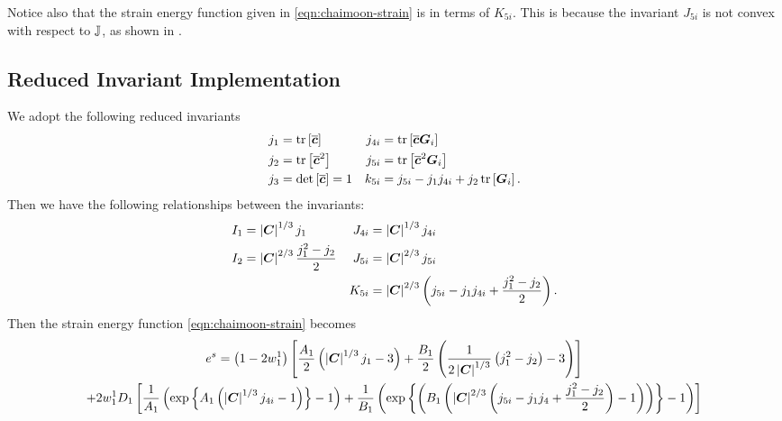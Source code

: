 \documentclass{article}
\begin{document}
\begin{remark}
   Notice also that the strain energy function given in \eqref{eqn:chaimoon-strain} is in terms of $K_{5i}$. 
   This is because the invariant $J_{5i}$ is not convex with respect to ${\mathbb J}$, as shown in \cite[Lem.~C.7]{schroder-neff-2003}.
\end{remark}

\subsection{Reduced Invariant Implementation}
We adopt the following reduced invariants
\begin{align*}
   j_1 &= \operatorname{tr}\left[\overline{{\boldsymbol c}}\right] & j_{4i} &= \operatorname{tr}\left[\overline{{\boldsymbol c}}{\boldsymbol G}_i\right] \\
   j_2 &= \operatorname{tr}\left[\overline{{\boldsymbol c}}^2\right] & j_{5i} &= \operatorname{tr}\left[\overline{{\boldsymbol c}}^2{\boldsymbol G}_i\right] \\
   j_3 &= \det\left[\overline{{\boldsymbol c}}\right] = 1 & k_{5i} &= j_{5i} - j_1j_{4i} + j_2\operatorname{tr}\left[{\boldsymbol G}_i\right].   
\end{align*}
Then we have the following relationships between the invariants:
\begin{align*}
   I_1 &= \left|{\boldsymbol C}\right|^{1/3} j_1 & J_{4i} &= \left|{\boldsymbol C}\right|^{1/3} j_{4i} \\
   I_2 &= \left|{\boldsymbol C}\right|^{2/3}\frac{j_1^2 - j_2}{2} & J_{5i} &= \left|{\boldsymbol C}\right|^{2/3} j_{5i} \\
   & & K_{5i} &= \left|{\boldsymbol C}\right|^{2/3}\left(j_{5i} - j_1j_{4i} + \frac{j_1^2 - j_2}{2}\right).
\end{align*}
Then the strain energy function \eqref{eqn:chaimoon-strain} becomes 
\begin{multline}
\label{eqn:aortic-eos}
    e^s=\left(1-2 w^1_1 \right)\left[\frac{A_1}{2}\left(\left|{\boldsymbol C}\right|^{1/3}j_1-3\right)+\frac{B_1}{2}\left(\frac{1}{2\left|{\boldsymbol C}\right|^{1/3}}\left(j_1^2-j_2\right)-3\right)\right]\\
    +2w^1_1D_1\left[\frac{1}{A_1}\left(\exp\left\{A_1\left(\left|{\boldsymbol C}\right|^{1/3}j_{4i}-1\right)\right\}-1\right)+\frac{1}{B_1}\left(\exp\left\{\left(B_1\left(\left|{\boldsymbol C}\right|^{2/3} \left(j_{5i}-j_1j_{4}+\frac{j_1^2-j_2}{2}\right)-1\right)\right)\right\}-1\right)\right]
\end{multline}

\newpage

\let\oldbibitem\bibitem
\renewcommand{\bibitem}{\setlength{\itemsep}{0pt}\oldbibitem}
% 

\end{document}
